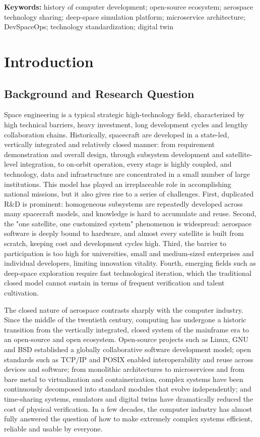 \documentclass[11pt]{article}
\begin{document}
\noindent\textbf{Keywords:} history of computer development; open-source ecosystem; aerospace technology sharing; deep-space simulation platform; microservice architecture; DevSpaceOps; technology standardization; digital twin

\section{Introduction}
\subsection{Background and Research Question}
Space engineering is a typical strategic high-technology field, characterized by high technical barriers, heavy investment, long development cycles and lengthy collaboration chains. Historically, spacecraft are developed in a state-led, vertically integrated and relatively closed manner: from requirement demonstration and overall design, through subsystem development and satellite-level integration, to on-orbit operation, every stage is highly coupled, and technology, data and infrastructure are concentrated in a small number of large institutions. This model has played an irreplaceable role in accomplishing national missions, but it also gives rise to a series of challenges. First, duplicated R\&D is prominent: homogeneous subsystems are repeatedly developed across many spacecraft models, and knowledge is hard to accumulate and reuse. Second, the "one satellite, one customized system" phenomenon is widespread: aerospace software is deeply bound to hardware, and almost every satellite is built from scratch, keeping cost and development cycles high. Third, the barrier to participation is too high for universities, small and medium-sized enterprises and individual developers, limiting innovation vitality. Fourth, emerging fields such as deep-space exploration require fast technological iteration, which the traditional closed model cannot sustain in terms of frequent verification and talent cultivation.

The closed nature of aerospace contrasts sharply with the computer industry. Since the middle of the twentieth century, computing has undergone a historic transition from the vertically integrated, closed system of the mainframe era to an open-source and open ecosystem. Open-source projects such as Linux, GNU and BSD established a globally collaborative software development model; open standards such as TCP/IP and POSIX enabled interoperability and reuse across devices and software; from monolithic architectures to microservices and from bare metal to virtualization and containerization, complex systems have been continuously decomposed into standard modules that evolve independently; and time-sharing systems, emulators and digital twins have dramatically reduced the cost of physical verification. In a few decades, the computer industry has almost fully answered the question of how to make extremely complex systems efficient, reliable and usable by everyone.
\end{document}
